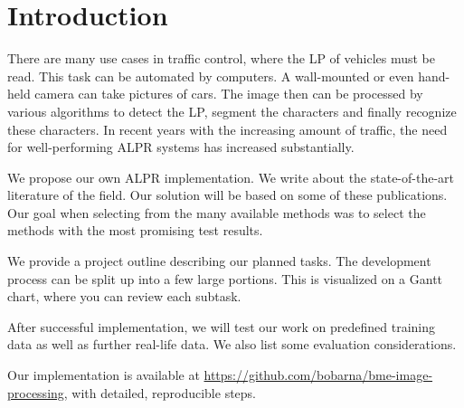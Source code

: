 \section{Introduction}

There are many use cases in traffic control, where the \ac{LP} of vehicles must
be read.  This task can be automated by computers. A wall-mounted or even
hand-held camera can take pictures of cars. The image then can be processed by
various algorithms to detect the \ac{LP}, segment the characters and finally
recognize these characters.  In recent years with the increasing amount of
traffic, the need for well-performing \ac{ALPR} systems has increased
substantially.

We propose our own \ac{ALPR} implementation.  We write about the
state-of-the-art literature of the field. Our solution will be based on some of
these publications. Our goal when selecting from the many available methods was
to select the methods with the most promising test results.

We provide a project outline describing our planned tasks. The development
process can be split up into a few large portions. This is visualized on a Gantt
chart, where you can review each subtask.

After successful implementation, we will test our work on predefined training
data as well as further real-life data. We also list some evaluation
considerations.

Our implementation is available at
\url{https://github.com/bobarna/bme-image-processing}, with detailed,
reproducible steps.
